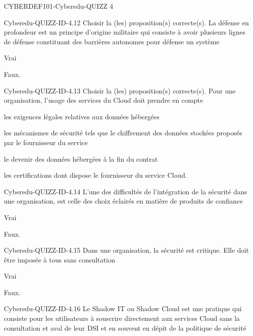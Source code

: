 \documentclass[12pt]{article}
\begin{document}
\begin{quiz}{CYBERDEF101-Cyberedu-QUIZZ 4}
\begin{multi}[multiple=true]{Cyberedu-QUIZZ-ID-4.12}
Choisir la (les) proposition(s) correcte(s). La d\'efense en profondeur est un principe d'origine militaire qui consiste \`a avoir plusieurs lignes de d\'efense constituant des barri\`eres autonomes pour d\'efense un syst\`eme 
\item*	Vrai
\item	Faux.
\end{multi}
\begin{multi}[multiple=true]{Cyberedu-QUIZZ-ID-4.13}
Choisir la (les) proposition(s) correcte(s). Pour une organisation, l'usage des services du Cloud doit prendre en compte 
\item*	les exigences l\'egales relatives aux donn\'ees h\'eberg\'ees
\item*	les m\'ecanismes de s\'ecurit\'e tels que le chiffrement des donn\'ees stock\'ees propos\'es par le fournisseur du service
\item* le devenir des donn\'ees h\'eberg\'ees \`a la fin du contrat
\item*	les certifications dont dispose le fournisseur du service Cloud.
\end{multi}
\begin{multi}[multiple=true]{Cyberedu-QUIZZ-ID-4.14}
L'une des difficult\'es de l'int\'egration de la s\'ecurit\'e dans une organisation, est celle des choix \'eclair\'es en mati\`ere de produits de confiance 
\item*	Vrai 
\item	Faux.
\end{multi}
\begin{multi}[multiple=true]{Cyberedu-QUIZZ-ID-4.15}
Dans une organisation, la s\'ecurit\'e est critique. Elle doit \^etre impos\'ee \`a tous sans consultation
\item	Vrai 
\item*	Faux.
\end{multi}
\begin{multi}[multiple=true]{Cyberedu-QUIZZ-ID-4.16}
Le  Shadow IT  ou  Shadow Cloud  est une pratique qui consiste pour les utilisateurs \`a souscrire directement aux services Cloud sans la consultation et aval de leur DSI et en souvent en d\'epit de la politique de s\'ecurit\'e 

\end{multi}
\end{quiz}
\end{document}
